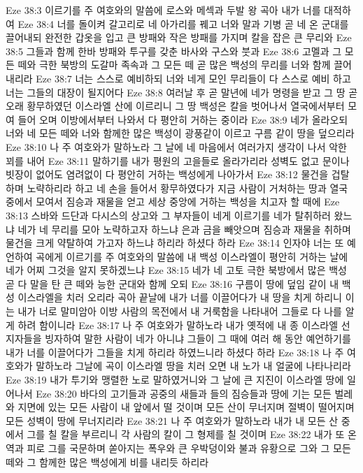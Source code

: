 Eze 38:3  이르기를 주 여호와의 말씀에 로스와 메섹과 두발 왕 곡아 내가 너를 대적하여
Eze 38:4  너를 돌이켜 갈고리로 네 아가리를 꿰고 너와 말과 기병 곧 네 온 군대를 끌어내되 완전한 갑옷을 입고 큰 방패와 작은 방패를 가지며 칼을 잡은 큰 무리와
Eze 38:5  그들과 함께 한바 방패와 투구를 갖춘 바사와 구스와 붓과
Eze 38:6  고멜과 그 모든 떼와 극한 북방의 도갈마 족속과 그 모든 떼 곧 많은 백성의 무리를 너와 함께 끌어 내리라
Eze 38:7  너는 스스로 예비하되 너와 네게 모인 무리들이 다 스스로 예비 하고 너는 그들의 대장이 될지어다
Eze 38:8  여러날 후 곧 말년에 네가 명령을 받고 그 땅 곧 오래 황무하였던 이스라엘 산에 이르리니 그 땅 백성은 칼을 벗어나서 열국에서부터 모여 들어 오며 이방에서부터 나와서 다 평안히 거하는 중이라
Eze 38:9  네가 올라오되 너와 네 모든 떼와 너와 함께한 많은 백성이 광풍같이 이르고 구름 같이 땅을 덮으리라
Eze 38:10  나 주 여호와가 말하노라 그 날에 네 마음에서 여러가지 생각이 나서 악한 꾀를 내어
Eze 38:11  말하기를 내가 평원의 고을들로 올라가리라 성벽도 없고 문이나 빗장이 없어도 염려없이 다 평안히 거하는 백성에게 나아가서
Eze 38:12  물건을 겁탈하며 노략하리라 하고 네 손을 들어서 황무하였다가 지금 사람이 거처하는 땅과 열국 중에서 모여서 짐승과 재물을 얻고 세상 중앙에 거하는 백성을 치고자 할 때에
Eze 38:13  스바와 드단과 다시스의 상고와 그 부자들이 네게 이르기를 네가 탈취하러 왔느냐 네가 네 무리를 모아 노략하고자 하느냐 은과 금을 빼앗으며 짐승과 재물을 취하며 물건을 크게 약탈하여 가고자 하느냐 하리라 하셨다 하라
Eze 38:14  인자야 너는 또 예언하여 곡에게 이르기를 주 여호와의 말씀에 내 백성 이스라엘이 평안히 거하는 날에 네가 어찌 그것을 알지 못하겠느냐
Eze 38:15  네가 네 고토 극한 북방에서 많은 백성 곧 다 말을 탄 큰 떼와 능한 군대와 함께 오되
Eze 38:16  구름이 땅에 덮임 같이 내 백성 이스라엘을 치러 오리라 곡아 끝날에 내가 너를 이끌어다가 내 땅을 치게 하리니 이는 내가 너로 말미암아 이방 사람의 목전에서 내 거룩함을 나타내어 그들로 다 나를 알게 하려 함이니라
Eze 38:17  나 주 여호와가 말하노라 내가 옛적에 내 종 이스라엘 선지자들을 빙자하여 말한 사람이 네가 아니냐 그들이 그 때에 여러 해 동안 예언하기를 내가 너를 이끌어다가 그들을 치게 하리라 하였느니라 하셨다 하라
Eze 38:18  나 주 여호와가 말하노라 그날에 곡이 이스라엘 땅을 치러 오면 내 노가 내 얼굴에 나타나리라
Eze 38:19  내가 투기와 맹렬한 노로 말하였거니와 그 날에 큰 지진이 이스라엘 땅에 일어나서
Eze 38:20  바다의 고기들과 공중의 새들과 들의 짐승들과 땅에 기는 모든 벌레와 지면에 있는 모든 사람이 내 앞에서 떨 것이며 모든 산이 무너지며 절벽이 떨어지며 모든 성벽이 땅에 무너지리라
Eze 38:21  나 주 여호와가 말하노라 내가 내 모든 산 중에서 그를 칠 칼을 부르리니 각 사람의 칼이 그 형제를 칠 것이며
Eze 38:22  내가 또 온역과 피로 그를 국문하며 쏟아지는 폭우와 큰 우박덩이와 불과 유황으로 그와 그 모든 떼와 그 함께한 많은 백성에게 비를 내리듯 하리라

